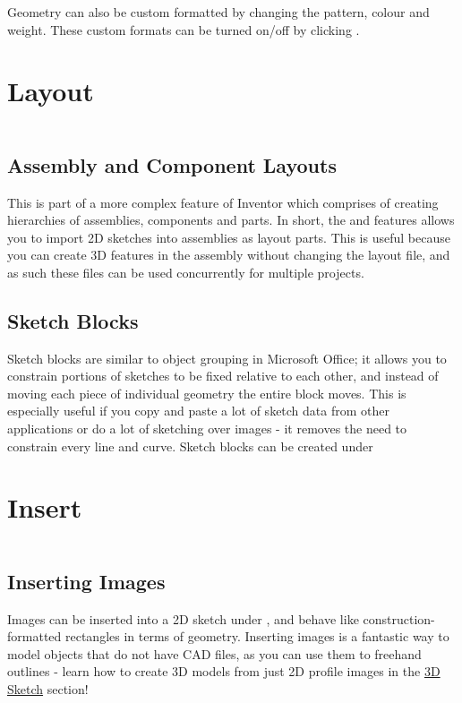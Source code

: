\begin{enumerate}
Geometry can also be custom formatted by changing the pattern, colour and weight. These custom formats can be turned on/off by clicking .

\section{Layout}

$ $

\subsection{Assembly and Component Layouts}
This is part of a more complex feature of Inventor which comprises of creating hierarchies of assemblies, components and parts. In short, the  and  features allows you to import 2D sketches into assemblies as layout parts. This is useful because you can create 3D features in the assembly without changing the layout file, and as such these files can be used concurrently for multiple projects.

\subsection{Sketch Blocks}
Sketch blocks are similar to object grouping in Microsoft Office; it allows you to constrain portions of sketches to be fixed relative to each other, and instead of moving each piece of individual geometry the entire block moves. This is especially useful if you copy and paste a lot of sketch data from other applications or do a lot of sketching over images - it removes the need to constrain every line and curve. Sketch blocks can be created under 

\section{Insert}

$ $

\subsection{Inserting Images}
Images can be inserted into a 2D sketch under , and behave like construction-formatted rectangles in terms of geometry. Inserting images is a fantastic way to model objects that do not have CAD files, as you can use them to freehand outlines - learn how to create 3D models from just 2D profile images in the \hyperref[section: 3D Sketches]{3D Sketch} section!


\end{enumerate}
